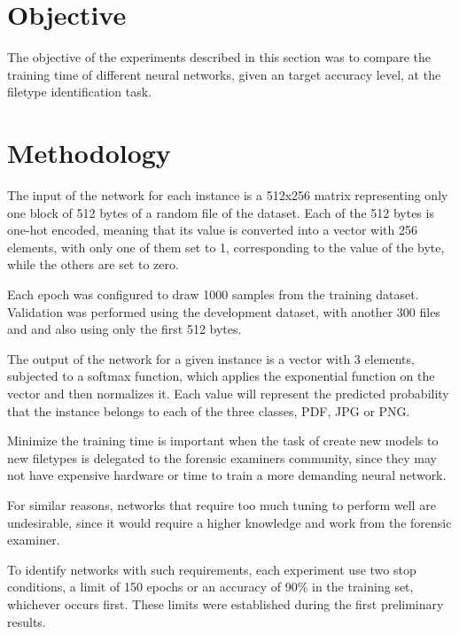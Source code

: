 \section{Objective}
The objective of the experiments described in this section 
was to compare the training time of different neural networks, given an target accuracy level, at the filetype identification task.

\section{Methodology}

The input of the network for each instance is a 512x256 matrix representing only one block of 512 bytes of a random file of the dataset. Each of the 512 bytes is one-hot encoded, meaning that its value is converted into a vector with 256 elements, with only one of them set to 1, corresponding to the value of the byte, while the others are set to zero.

Each epoch was configured to draw 1000 samples from the training dataset. Validation was performed using the development dataset, with another 300 files and and also using only the first 512 bytes.


The output of the network for a given instance is a vector with 3 elements, subjected to a softmax function, which applies the exponential function on the vector and then normalizes it. Each value will represent the predicted probability that the instance belongs to each of the three classes, PDF, JPG or PNG.

Minimize the training time is important when the task of create new models to new filetypes is delegated to the forensic examiners community, since they may not have expensive hardware or time to train a more demanding neural network.

For similar reasons, networks that require too much tuning to perform well are undesirable, since it would require a higher knowledge and work from the forensic examiner.


To identify networks with such requirements, each experiment use two stop conditions, a limit of 150 epochs or an accuracy of 90\% in the training set, whichever occurs first. These limits were established during the first preliminary results.

